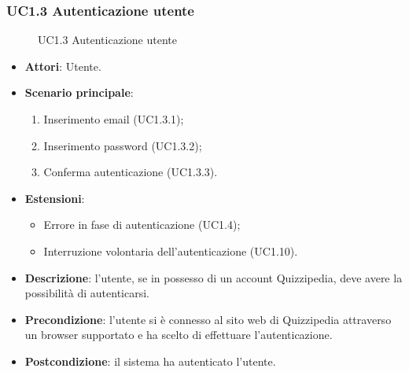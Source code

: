 \subsubsection{UC1.3 Autenticazione utente}
\begin{figure}[H]
\centering
\noindent{}
\caption{UC1.3 Autenticazione utente}
\end{figure}
\begin{itemize}
\item \textbf{Attori}: Utente.
\item \textbf{Scenario principale}:
\begin{enumerate}
\item Inserimento email (UC1.3.1);
\item Inserimento password (UC1.3.2);
\item Conferma autenticazione (UC1.3.3).
\end{enumerate}
\item \textbf{Estensioni}:
\begin{itemize}
\item Errore in fase di autenticazione (UC1.4);
\item Interruzione volontaria dell'autenticazione (UC1.10).
\end{itemize}
\item \textbf{Descrizione}: l'utente, se in possesso di un account Quizzipedia, deve avere la possibilità di autenticarsi.
\item \textbf{Precondizione}: l'utente si è connesso al sito web di Quizzipedia attraverso un browser supportato e ha scelto di effettuare l'autenticazione.
\item \textbf{Postcondizione}: il sistema ha autenticato l'utente.
\end{itemize}
